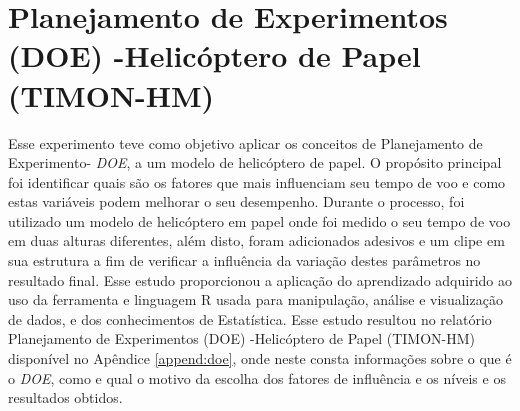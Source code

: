 \section{Planejamento de Experimentos (DOE) -Helicóptero de Papel (TIMON-HM)}
\label{sec:analise_doe}
Esse experimento teve como objetivo aplicar os conceitos de Planejamento de Experimento- \textit{DOE}, a um modelo de helicóptero de papel. O propósito principal foi identificar quais são os fatores que mais influenciam seu tempo de voo e como estas variáveis podem melhorar o seu desempenho. Durante o processo, foi utilizado um modelo de helicóptero em papel onde foi medido o seu tempo de voo em duas alturas diferentes, além disto, foram adicionados adesivos e um clipe em sua estrutura a fim de verificar a influência da variação destes parâmetros no resultado final. Esse estudo proporcionou a aplicação do aprendizado adquirido ao uso da ferramenta e linguagem R usada para manipulação, análise e visualização de dados, e dos conhecimentos de Estatística. 
Esse estudo resultou no relatório Planejamento de Experimentos (DOE) -Helicóptero de Papel (TIMON-HM) disponível no Apêndice \ref{append:doe}, onde neste consta informações sobre o que é o \textit{DOE}, como e qual o motivo da escolha dos fatores de influência e os níveis e os resultados obtidos. 